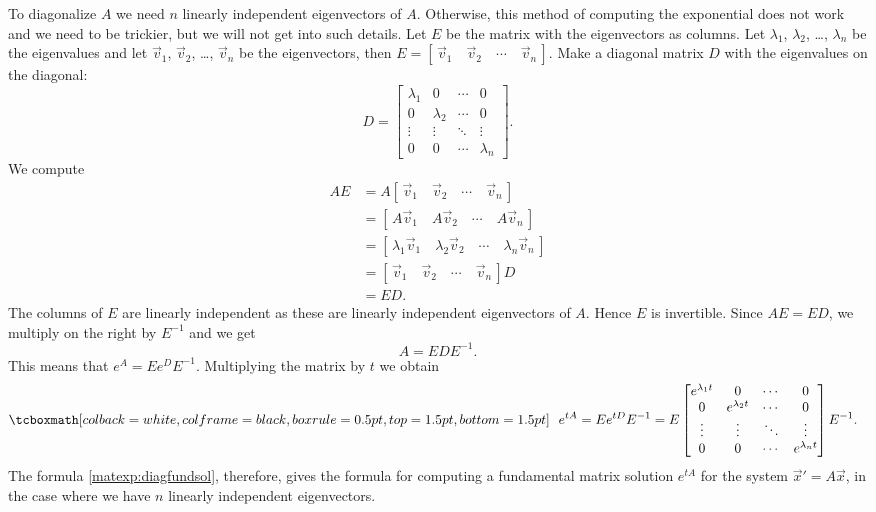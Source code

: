 To diagonalize $A$
we need $n$ linearly independent eigenvectors of $A$.
Otherwise, this method of computing the exponential does not work and we need to be trickier, but we will
not get into such details.
Let $E$ be the matrix with the eigenvectors as columns.  
Let $\lambda_1$, $\lambda_2$, \ldots, $\lambda_n$ be the eigenvalues and
let $\vec{v}_1$, $\vec{v}_2$, \ldots, $\vec{v}_n$ be the eigenvectors, then
$E = [\, \vec{v}_1 \quad \vec{v}_2 \quad \cdots \quad \vec{v}_n \,]$.
Make a diagonal matrix $D$ with the eigenvalues on the diagonal:
\begin{equation*}
D =
\begin{bmatrix}
\lambda_1 & 0 & \cdots & 0 \\
0 & \lambda_2 & \cdots & 0 \\
\vdots & \vdots & \ddots & \vdots \\
0 & 0 & \cdots & \lambda_n
\end{bmatrix} .
\end{equation*}
We compute
\begin{equation*}
\begin{split}
AE & = A 
[\, \vec{v}_1 \quad \vec{v}_2 \quad \cdots \quad \vec{v}_n \,]
\\
& =
[\, A\vec{v}_1 \quad A\vec{v}_2 \quad \cdots \quad A\vec{v}_n \,]
\\
& =
[\, \lambda_1 \vec{v}_1 \quad \lambda_2 \vec{v}_2 \quad \cdots \quad
\lambda_n \vec{v}_n \,]
\\
& =
[\, \vec{v}_1 \quad \vec{v}_2 \quad \cdots \quad \vec{v}_n \,] D
\\
& =
ED .
\end{split}
\end{equation*}
The columns of $E$ are linearly independent as these are
linearly independent eigenvectors of
$A$.  Hence $E$ is invertible.
Since $AE = ED$, we multiply on the right by $E^{-1}$ and we get
\begin{equation*}
A = E D E^{-1}.
\end{equation*}
This means that $e^A = E e^D E^{-1}$.  Multiplying the matrix by $t$ we obtain
\begin{equation} \label{matexp:diagfundsol}
\mybxbg{~~
e^{tA} = 
Ee^{tD}E^{-1} = 
E
\begin{bmatrix}
e^{\lambda_1 t} & 0 & \cdots & 0 \\
0 & e^{\lambda_2 t} & \cdots & 0 \\
\vdots & \vdots & \ddots & \vdots \\
0 & 0 & \cdots & e^{\lambda_n t}
\end{bmatrix} 
E^{-1} .
~~}
\end{equation}
The formula \eqref{matexp:diagfundsol}, therefore, gives the formula
for computing a fundamental matrix solution $e^{tA}$ for the
system ${\vec{x}}' = A \vec{x}$, in the case where we have
$n$ linearly independent eigenvectors.

